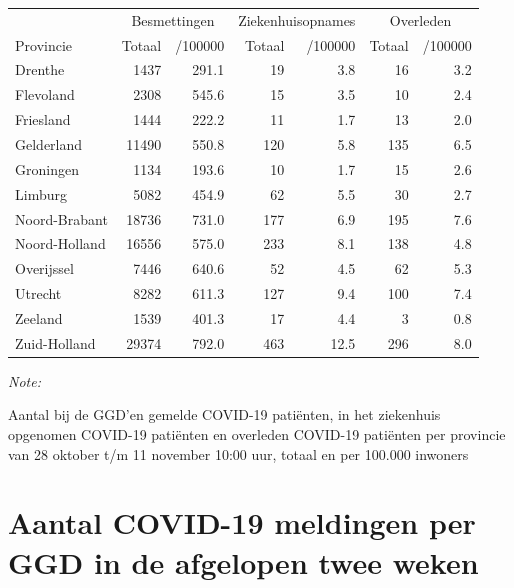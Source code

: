 \documentclass[
  english,
  man,floatsintext]{apa6}
\begin{document}
\begin{table}[H]
\centering
\begin{threeparttable}
\begin{tabular}{lrrrrrr}
\toprule
\multicolumn{1}{c}{ } & \multicolumn{2}{c}{Besmettingen} & \multicolumn{2}{c}{Ziekenhuisopnames} & \multicolumn{2}{c}{Overleden} \\
\cmidrule(l{3pt}r{3pt}){2-3} \cmidrule(l{3pt}r{3pt}){4-5} \cmidrule(l{3pt}r{3pt}){6-7}
Provincie & Totaal & /100000 & Totaal & /100000 & Totaal & /100000\\
\midrule
Drenthe & 1437 & 291.1 & 19 & 3.8 & 16 & 3.2\\
Flevoland & 2308 & 545.6 & 15 & 3.5 & 10 & 2.4\\
Friesland & 1444 & 222.2 & 11 & 1.7 & 13 & 2.0\\
Gelderland & 11490 & 550.8 & 120 & 5.8 & 135 & 6.5\\
Groningen & 1134 & 193.6 & 10 & 1.7 & 15 & 2.6\\
Limburg & 5082 & 454.9 & 62 & 5.5 & 30 & 2.7\\
Noord-Brabant & 18736 & 731.0 & 177 & 6.9 & 195 & 7.6\\
Noord-Holland & 16556 & 575.0 & 233 & 8.1 & 138 & 4.8\\
Overijssel & 7446 & 640.6 & 52 & 4.5 & 62 & 5.3\\
Utrecht & 8282 & 611.3 & 127 & 9.4 & 100 & 7.4\\
Zeeland & 1539 & 401.3 & 17 & 4.4 & 3 & 0.8\\
Zuid-Holland & 29374 & 792.0 & 463 & 12.5 & 296 & 8.0\\
\bottomrule
\end{tabular}
\begin{tablenotes}
\item \textit{Note: } 
\item Aantal bij de GGD’en gemelde COVID-19 patiënten, in het ziekenhuis opgenomen COVID-19 patiënten en overleden COVID-19 patiënten per provincie van 28 oktober t/m 11 november 10:00 uur, totaal en per 100.000 inwoners
\end{tablenotes}
\end{threeparttable}
\end{table}

\newpage

\hypertarget{aantal-covid-19-meldingen-per-ggd-in-de-afgelopen-twee-weken}{%
\section{Aantal COVID-19 meldingen per GGD in de afgelopen twee weken}\label{aantal-covid-19-meldingen-per-ggd-in-de-afgelopen-twee-weken}}
\end{document}
